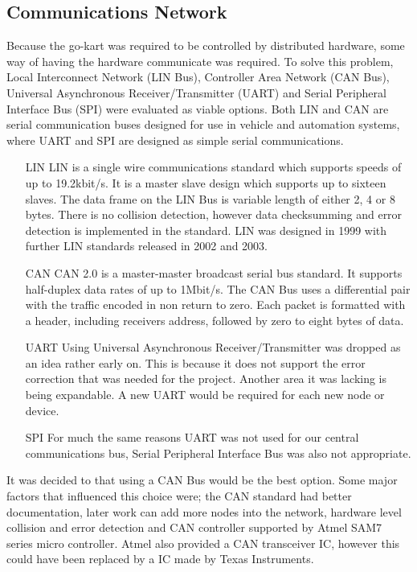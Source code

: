   \subsection{Communications Network}
  Because the go-kart was required to be controlled by distributed hardware,
  some way of having the hardware communicate was required. To solve this
  problem, Local Interconnect Network (LIN Bus), Controller Area Network (CAN
  Bus), Universal Asynchronous Receiver/Transmitter (UART) and Serial
  Peripheral Interface Bus (SPI) were evaluated as viable options. Both LIN and
  CAN are serial communication buses designed for use in vehicle and automation
  systems, where UART and SPI are designed as simple serial communications.
  
  \begin{itemize}
    \item[LIN]{LIN is a single wire communications standard which supports
    speeds of up to 19.2kbit/s. It is a master slave design which supports up
    to sixteen slaves. The data frame on the LIN Bus is variable length of
    either 2, 4 or 8 bytes. There is no collision detection, however data
    checksumming and error detection is implemented in the standard.  LIN was
    designed in 1999 with further LIN standards released in 2002 and 2003.}

    \item[CAN]{CAN 2.0 is a master-master broadcast serial bus standard. It
    supports half-duplex data rates of up to 1Mbit/s. The CAN Bus uses a
    differential pair with the traffic encoded in non return to zero. Each
    packet is formatted with a header, including receivers address, followed by
    zero to eight bytes of data.}

    \item[UART]{Using Universal Asynchronous Receiver/Transmitter was dropped
    as an idea rather early on. This is because it does not support the error
    correction that was needed for the project. Another area it was lacking is
    being expandable. A new UART would be required for each new node or
    device.}

    \item[SPI]{For much the same reasons UART was not used for our central
    communications bus, Serial Peripheral Interface Bus was also not
    appropriate.} 

  \end{itemize}

  It was decided to that using a CAN Bus would be the best option. Some major
  factors that influenced this choice were; the CAN standard had better
  documentation, later work can add more nodes into the network, hardware level
  collision and error detection and CAN controller supported by Atmel SAM7
  series micro controller. Atmel also provided a CAN transceiver
  IC\cite{ata666}, however this could have been replaced by a IC made by Texas
  Instruments\cite{ti-can-trans}.

